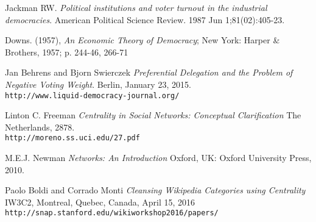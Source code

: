 \documentclass[10pt]{article}
\theoremstyle{definition}
\begin{document}
\begin{thebibliography}{9}

Jackman RW. \textit{Political institutions and voter turnout in the industrial democracies}. American Political Science Review. 1987 Jun 1;81(02):405-23.

Downs. (1957), \textit{An Economic Theory of Democracy}; New York: Harper \& Brothers, 1957; p. 244-46, 266-71

Jan Behrens and Bjorn Swierczek
\textit{Preferential Delegation and the Problem of Negative Voting Weight}. 
Berlin, January 23, 2015.
\\\texttt{http://www.liquid-democracy-journal.org/}


Linton C. Freeman
\textit{Centrality in Social Networks: Conceptual Clarification}
The Netherlands, 2878.
\\\texttt{http://moreno.ss.uci.edu/27.pdf}

M.E.J. Newman
\textit{Networks: An Introduction}
Oxford, UK: Oxford University Press, 2010.

Paolo Boldi and Corrado Monti
\textit{Cleansing Wikipedia Categories using Centrality}
IW3C2, Montreal, Quebec, Canada, April 15, 2016
\\\texttt{http://snap.stanford.edu/wikiworkshop2016/papers/}

\end{thebibliography}
\end{document}
